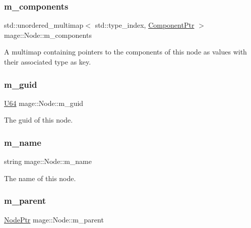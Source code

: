 \subsubsection{\texorpdfstring{m\+\_\+components}{m\_components}}
{\footnotesize\ttfamily std\+::unordered\+\_\+multimap$<$ std\+::type\+\_\+index, \hyperlink{classmage_1_1_node_a46b7e1f4f5b98bfa78ed96a80797a4ba}{Component\+Ptr} $>$ mage\+::\+Node\+::m\+\_\+components\hspace{0.3cm}{\ttfamily [private]}}

A multimap containing pointers to the components of this node as values with their associated type as key. \hypertarget{classmage_1_1_node_a3ef1876293074bfcc01104eb92f1bfdf}{}\label{classmage_1_1_node_a3ef1876293074bfcc01104eb92f1bfdf} 
\subsubsection{\texorpdfstring{m\+\_\+guid}{m\_guid}}
{\footnotesize\ttfamily \hyperlink{namespacemage_a6672cf3c861707ce4a3235a3eb43941d}{U64} mage\+::\+Node\+::m\+\_\+guid\hspace{0.3cm}{\ttfamily [private]}}

The guid of this node. \hypertarget{classmage_1_1_node_a476cc21fa65cdf9bde0f11fe08b5a707}{}\label{classmage_1_1_node_a476cc21fa65cdf9bde0f11fe08b5a707} 
\subsubsection{\texorpdfstring{m\+\_\+name}{m\_name}}
{\footnotesize\ttfamily string mage\+::\+Node\+::m\+\_\+name\hspace{0.3cm}{\ttfamily [private]}}

The name of this node. \hypertarget{classmage_1_1_node_aa04f166b52fca444c8756c0864a16cde}{}\label{classmage_1_1_node_aa04f166b52fca444c8756c0864a16cde} 
\subsubsection{\texorpdfstring{m\+\_\+parent}{m\_parent}}
{\footnotesize\ttfamily \hyperlink{classmage_1_1_node_ac575dc006e0ae1134277ade977dc06b6}{Node\+Ptr} mage\+::\+Node\+::m\+\_\+parent\hspace{0.3cm}{\ttfamily [private]}}


